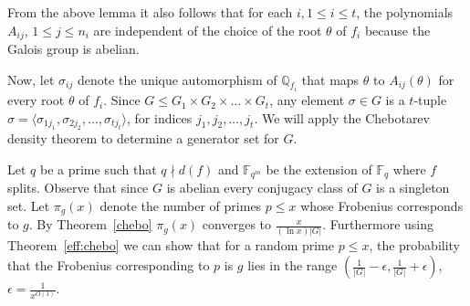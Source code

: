 \documentclass{article}
\newcommand{\Q}[0]{\ensuremath{\mathbb{Q}}}
\newcommand{\F}[0]{\ensuremath{\mathbb{F}}}
\renewcommand{\angle}[1]{\langle #1\rangle}
\begin{document}
%  
%    

{From} the above lemma it also follows that for each $i, 1\leq i\leq
t$, the polynomials $A_{ij}$, $1\leq j\leq n_i$ are independent of the
choice of the root $\theta$ of $f_i$ because the Galois group is
abelian.

Now, let $\sigma_{ij}$ denote the unique automorphism of $\Q_{f_i}$
that maps $\theta$ to $A_{ij}(\theta)$ for every root $\theta$ of
$f_i$. Since $G \leq G_1 \times G_2 \times \ldots \times G_t$, any
element $\sigma\in G$ is a $t$-tuple $\sigma =
\angle{\sigma_{1j_1},\sigma_{2j_2},\ldots,\sigma_{tj_t}}$, for indices
$j_1,j_2,\ldots,j_t$. We will apply the Chebotarev density theorem to
determine a generator set for $G$.

Let $q$ be a prime such that $q \nmid d(f)$ and $\F_{q^m}$ be the
extension of $\F_q$ where $f$ splits. Observe that since $G$ is
abelian every conjugacy class of $G$ is a singleton set. Let
$\pi_g(x)$ denote the number of primes $p \leq x$ whose Frobenius
corresponds to $g$. By Theorem~\ref{chebo} $\pi_g(x)$ converges to
$\frac{x}{(\ln x)|G|}$. Furthermore using Theorem~\ref{eff:chebo} we
can show that for a random prime $p \leq x$, the probability that the
Frobenius corresponding to  $p$ is $g$ lies in the range
$\left(\frac{1}{|G|} - \epsilon, \frac{1}{|G|} + \epsilon \right)$,
$\epsilon = \frac{1}{x^{O(1)}}$.
  
\end{document}
